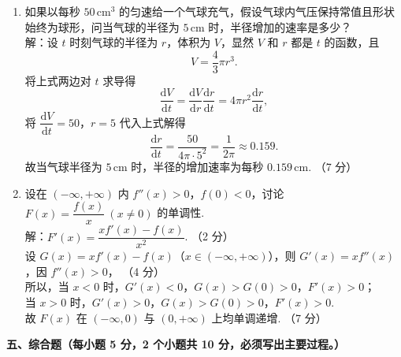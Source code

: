\documentclass[a4paper,11pt]{ctexart}
\newcommand{\dd}{\mathrm{d}}
\newcommand{\score}[1]{\hfill（#1）}
\begin{document}
\begin{enumerate}[label=\arabic*., start=17, leftmargin=2em, itemsep=1.0em, topsep=0.5em]
  \item 如果以每秒 $50\,\mathrm{cm}^3$ 的匀速给一个气球充气，假设气球内气压保持常值且形状始终为球形，问当气球的半径为 $5\,\mathrm{cm}$ 时，半径增加的速率是多少？\\[0.3em]
  解：设 $t$ 时刻气球的半径为 $r$，体积为 $V$，显然 $V$ 和 $r$ 都是 $t$ 的函数，且
  \[
    V = \frac{4}{3}\pi r^3. \tag*{（2 分）}
  \]
  将上式两边对 $t$ 求导得
  \[
    \frac{\dd V}{\dd t} = \frac{\dd V}{\dd r}\frac{\dd r}{\dd t} = 4\pi r^2 \frac{\dd r}{\dd t}, \tag*{（4 分）}
  \]
  将 $\dfrac{\dd V}{\dd t} = 50$，$r = 5$ 代入上式解得
  \[
    \frac{\dd r}{\dd t} = \frac{50}{4\pi\cdot 5^2} = \frac{1}{2\pi} \approx 0.159.
  \]
  故当气球半径为 $5\,\mathrm{cm}$ 时，半径的增加速率为每秒 $0.159\,\mathrm{cm}$. \score{7 分}

  \item 设在 $(-\infty, +\infty)$ 内 $f''(x) > 0$，$f(0) < 0$，讨论 $F(x) = \dfrac{f(x)}{x}~(x\neq 0)$ 的单调性.\\[0.3em]
  解：$F'(x) = \dfrac{x f'(x) - f(x)}{x^2}$. \score{2 分}\\[0.3em]
  设 $G(x) = x f'(x) - f(x)$（$x\in(-\infty, +\infty)$），则 $G'(x) = x f''(x)$，因 $f''(x) > 0$， \score{4 分}\\[0.3em]
  所以，当 $x < 0$ 时，$G'(x) < 0$，$G(x) > G(0) > 0$，$F'(x) > 0$；\\[0.2em]
  当 $x > 0$ 时，$G'(x) > 0$，$G(x) > G(0) > 0$，$F'(x) > 0$.\\[0.3em]
  故 $F(x)$ 在 $(-\infty, 0)$ 与 $(0, +\infty)$ 上均单调递增. \score{7 分}
\end{enumerate}

\vspace{0.8em}

\textbf{五、综合题（每小题 5 分，2 个小题共 10 分，必须写出主要过程。）}
\end{document}
